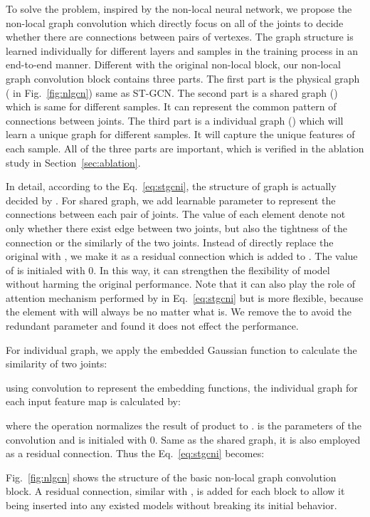 \documentclass[10pt,twocolumn,letterpaper]{article}
\begin{document}
    To solve the problem, inspired by the non-local neural network, we propose the non-local graph convolution which directly focus on all of the joints to decide whether there are connections between pairs of vertexes. The graph structure is learned individually for different layers and samples in the training process in an end-to-end manner. Different with the original non-local block, our non-local graph convolution block contains three parts. The first part is the physical graph ( in Fig.~\ref{fig:nlgcn}) same as ST-GCN. The second part is a shared graph () which is same for different samples. It can represent the common pattern of connections between joints. The third part is a individual graph () which will learn a unique graph for different samples. It will capture the unique features of each sample. All of the three parts are important, which is verified in the ablation study in Section~\ref{sec:ablation}.
    
    In detail, according to the Eq.~\ref{eq:stgcni}, the structure of graph is actually decided by . For shared graph, we add   learnable parameter  to represent the connections between each pair of joints. The value of each element denote not only whether there exist edge between two joints, but also the tightness of the connection or the similarly of the two joints. Instead of directly replace the original  with , we make it as a residual connection which is added to . The value of  is initialed with 0. In this way, it can strengthen the flexibility of model without harming the original performance. 
    Note that it can also play the role of attention mechanism performed by  in Eq.~\ref{eq:stgcni} but is more flexible, because the element with  will always be  no matter what  is. We remove the  to avoid the redundant parameter and found it does not effect the performance.
    
    For individual graph, we apply the embedded Gaussian function to calculate the similarity of two joints:
    
    using  convolution to represent the embedding functions, the individual graph for each input feature map is calculated by:
    
    where the  operation normalizes the result of product to .  is the parameters of the  convolution and is initialed with 0. Same as the shared graph, it is also employed as a residual connection. Thus the Eq.~\ref{eq:stgcni} becomes:
    
    Fig.~\ref{fig:nlgcn} shows the structure of the basic non-local graph convolution block. A residual connection, similar with \cite{he_deep_2016}, is added for each block to allow it being inserted into any existed models without breaking its initial behavior.
    
\end{document}
